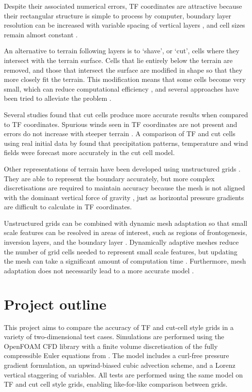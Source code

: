 Despite their associated numerical errors, TF coordinates are attractive because their rectangular structure is simple to process by computer, boundary layer resolution can be increased with variable spacing of vertical layers \autocite{schaer2002}, and cell sizes remain almost constant \autocite{jebens2011}.

An alternative to terrain following layers is to `shave', or `cut', cells where they intersect with the terrain surface.  Cells that lie entirely below the terrain are removed, and those that intersect the surface are modified in shape so that they more closely fit the terrain.  This modification means that some cells become very small, which can reduce computational efficiency \autocite{klein2009}, and several approaches have been tried to alleviate the problem \parencites{steppeler2002}{yamazaki-satomura2010}{jebens2011}.

Several studies found that cut cells produce more accurate results when compared to TF coordinates.  Spurious winds seen in TF coordinates are not present and errors do not increase with steeper terrain \autocite{good2013}.  A comparison of TF and cut cells using real initial data by \textcite{steppeler2006} found that precipitation patterns, temperature and wind fields were forecast more accurately in the cut cell model.  

Other representations of terrain have been developed using unstructured grids \parencites{ss2011}{pain2005}.  They are able to represent the boundary accurately, but more complex discretisations are required to maintain accuracy because the mesh is not aligned with the dominant vertical force of gravity \autocite{rosatti2005}, just as horizontal pressure gradients are difficult to calculate in TF coordinates.

Unstructured grids can be combined with dynamic mesh adaptation so that small scale features can be resolved in areas of interest, such as regions of frontogenesis, inversion layers, and the boundary layer \autocite{browne2014}.  Dynamically adaptive meshes reduce the number of grid cells needed to represent small scale features, but updating the mesh can take a significant amount of computation time \parencites{blaise2012}{browne2014}.  Furthermore, mesh adaptation does not necessarily lead to a more accurate model \autocite{parkinson2014}.

\section*{Project outline}
This project aims to compare the accuracy of TF and cut-cell style grids in a variety of two-dimensional test cases.   Simulations are performed using the OpenFOAM CFD library \autocite{openfoam} with a finite volume discretisation of the fully compressible Euler equations from \textcite{weller-shahrokhi2014}.  The model includes a curl-free pressure gradient formulation, an upwind-biased cubic advection scheme, and a Lorenz vertical staggering of variables.  All tests are performed using the same model on TF and cut cell style grids, enabling like-for-like comparison between grids.

